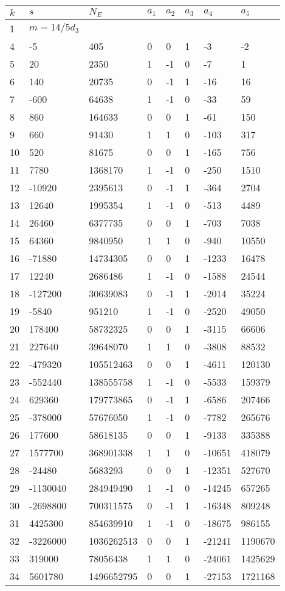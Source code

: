 \documentclass{amsart}
\begin{document}
\begin{longtable}{|l|l|l|lllll|}
\hline
$k$ & $s$ & $N_E$ & $a_1$ & $a_2$ & $a_3$ & $a_4$ & $a_5$\\
\hline
1&$m=14/5d_{3}$&&\multicolumn{5}{c|}{}\\
4&-5&405&0&0&1&-3&-2\\
5&20&2350&1&-1&0&-7&1\\
6&140&20735&0&-1&1&-16&16\\
7&-600&64638&1&-1&0&-33&59\\
8&860&164633&0&0&1&-61&150\\
9&660&91430&1&1&0&-103&317\\
10&520&81675&0&0&1&-165&756\\
11&7780&1368170&1&-1&0&-250&1510\\
12&-10920&2395613&0&-1&1&-364&2704\\
13&12640&1995354&1&-1&0&-513&4489\\
14&26460&6377735&0&0&1&-703&7038\\
15&64360&9840950&1&1&0&-940&10550\\
16&-71880&14734305&0&0&1&-1233&16478\\
17&12240&2686486&1&-1&0&-1588&24544\\
18&-127200&30639083&0&-1&1&-2014&35224\\
19&-5840&951210&1&-1&0&-2520&49050\\
20&178400&58732325&0&0&1&-3115&66606\\
21&227640&39648070&1&1&0&-3808&88532\\
22&-479320&105512463&0&0&1&-4611&120130\\
23&-552440&138555758&1&-1&0&-5533&159379\\
24&629360&179773865&0&-1&1&-6586&207466\\
25&-378000&57676050&1&-1&0&-7782&265676\\
26&177600&58618135&0&0&1&-9133&335388\\
27&1577700&368901338&1&1&0&-10651&418079\\
28&-24480&5683293&0&0&1&-12351&527670\\
29&-1130040&284949490&1&-1&0&-14245&657265\\
30&-2698800&700311575&0&-1&1&-16348&809248\\
31&4425300&854639910&1&-1&0&-18675&986155\\
32&-3226000&1036262513&0&0&1&-21241&1190670\\
33&319000&78056438&1&1&0&-24061&1425629\\
34&5601780&1496652795&0&0&1&-27153&1721168\\

\end{longtable}
\end{document}

